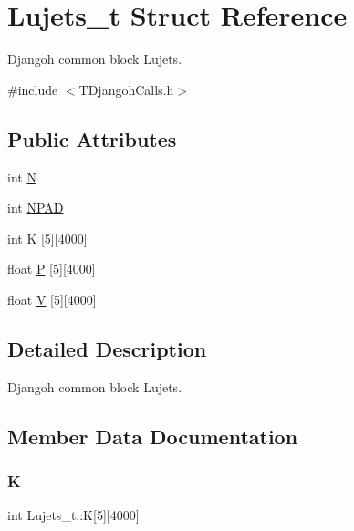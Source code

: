 \hypertarget{struct_lujets__t}{}\section{Lujets\+\_\+t Struct Reference}
\label{struct_lujets__t}


Djangoh common block Lujets.  




{\ttfamily \#include $<$T\+Djangoh\+Calls.\+h$>$}

\subsection*{Public Attributes}
\begin{DoxyCompactItemize}
\item 
int \hyperlink{struct_lujets__t_a17571954fa27f93e7a5bdaf763057547}{N}
\item 
int \hyperlink{struct_lujets__t_a9bfadb28d8093e469dfed54f7df5b80e}{N\+P\+AD}
\item 
int \hyperlink{struct_lujets__t_ad8aaaaff1a45805c18b56154446bdf16}{K} \mbox{[}5\mbox{]}\mbox{[}4000\mbox{]}
\item 
float \hyperlink{struct_lujets__t_a591c8754d8715473ba628f50888dbb2d}{P} \mbox{[}5\mbox{]}\mbox{[}4000\mbox{]}
\item 
float \hyperlink{struct_lujets__t_afdbdeea4a29351bc83bf85c549b6a796}{V} \mbox{[}5\mbox{]}\mbox{[}4000\mbox{]}
\end{DoxyCompactItemize}


\subsection{Detailed Description}
Djangoh common block Lujets. 

\subsection{Member Data Documentation}
\mbox{\label{struct_lujets__t_ad8aaaaff1a45805c18b56154446bdf16}} 
\subsubsection{\texorpdfstring{K}{K}}
{\footnotesize\ttfamily int Lujets\+\_\+t\+::K\mbox{[}5\mbox{]}\mbox{[}4000\mbox{]}}

